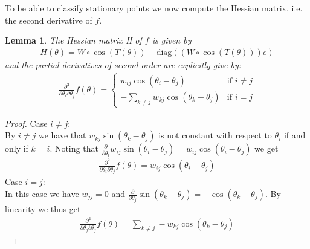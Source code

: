 \documentclass[12pt,a4paper]{article}
\theoremstyle{mythm}
\newtheorem{lem}[thm]{Lemma}
\begin{document}
To be able to classify stationary points we now compute the Hessian matrix, i.e. the second derivative of $ f $.
\begin{lem}
The Hessian matrix H of $ f $ is given by 
\begin{align}
\label{def:Hessian} 
H(\theta) = W \circ \cos( T(\theta) ) - \text{diag} \left(  \left( W \circ \cos( T (\theta) ) \right) e  \right) 
\end{align} 
and the partial derivatives of second order are explicitly give by:
\begin{align*}
\frac{ \partial ^{ 2 }  }{ \partial \theta_i \partial \theta_j } f(\theta) = \begin{cases}
w _{ij} \cos( \theta_i - \theta_j )  & \text{if } i \neq j \\
- \sum_{ k \neq j  }^{ }w _{ kj } \cos( \theta_k - \theta_j )   & \text{if } i =j 
\end{cases}
\end{align*} 
\end{lem} 
\begin{proof}
Case $ i \neq j$: \\
By $ i \neq j  $ we have that $ w _{ kj } \sin( \theta_k - \theta_j  )  $ is not constant with respect to $ \theta_i $ if and only if $ k = i $. Noting that $ \frac{ \partial
}{ \partial \theta_i } w _{ ij } \sin( \theta_i - \theta_j ) = w _{ ij } \cos( \theta_i - \theta_j )   $ we get
\begin{align*}
\frac{ \partial ^{ 2 }  }{ \partial \theta_i \partial \theta_j } f (\theta) = w _{ ij } \cos( \theta_i - \theta_j ) 
\end{align*} 
Case $ i = j $: \\
In this case we have $ w _{ jj } = 0 $ and $ \frac{ \partial  }{ \partial \theta_j } \sin( \theta_k - \theta_j  ) = - \cos( \theta_k - \theta_j ) $. By linearity we thus get
\begin{align*}
\frac{ \partial ^{ 2 }  }{ \partial \theta_j \partial \theta_j } f(\theta) = \sum_{ k \neq j   }^{  } -w _{ kj } \cos( \theta_k - \theta_j ) 
\end{align*} 
\end{proof}
\end{document}
